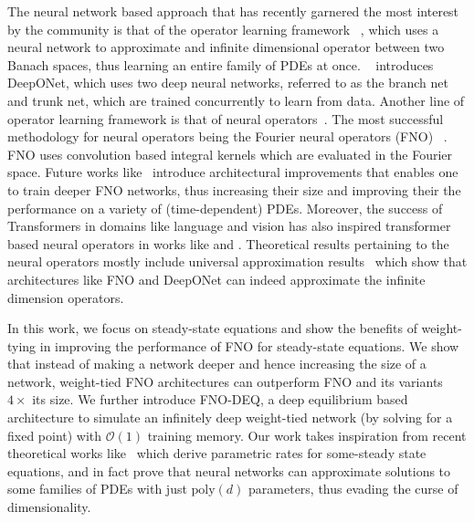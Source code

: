 The neural network based approach that has recently 
garnered the most interest by the community is that of 
the operator learning framework
~\citep{chen1995universal,kovachki2021neural,lu2019deeponet,li2020fourier,bhattacharya2021model},
which uses a neural network to approximate 
and infinite dimensional operator between two Banach spaces, 
thus learning an entire family of PDEs at once.
~\citet{lu2019deeponet} introduces DeepONet, which uses two 
deep neural networks, referred to as the branch net and trunk net, which are 
trained concurrently to learn from data.
Another line of operator learning framework is that of neural operators~\cite{kovachki2021neural}.
The most successful methodology for neural operators being the
Fourier neural operators (FNO)
~\citep{li2020fourier}.
FNO 
uses convolution based integral kernels which are evaluated in the
Fourier space. 
Future works like~\cite{tran2021factorized}
introduce architectural improvements that enables one to train 
deeper FNO networks, thus increasing their size and improving their 
the performance on a variety of (time-dependent) PDEs. 
Moreover, the success of Transformers in domains like language and vision
has also inspired transformer based neural operators in works like
\citet{li2022transformer, hao2023gnot} and \citet{Liu2022-nd}.
Theoretical results pertaining to the neural operators
mostly include universal approximation results~\cite{kovachki2021universal,lanthaler2022error} which show
that architectures like FNO and DeepONet can indeed approximate the infinite dimension operators.

In this work, we focus on steady-state equations
and show the benefits of weight-tying in improving the performance 
of FNO for steady-state equations. 
We show that instead of making a network deeper and hence increasing the size
of a network, 
weight-tied FNO architectures can outperform FNO and its variants $4\times$
its size. 
We further introduce FNO-DEQ, a deep equilibrium 
based architecture to simulate an infinitely deep weight-tied 
network (by solving for a fixed point)
with $\mathcal{O}(1)$ training memory.
Our work takes inspiration from 
recent 
theoretical works like~\cite{marwah2021parametric, chen2021representation, marwah2022neural}
which derive parametric rates for some-steady state equations, and 
in fact prove that neural networks can approximate solutions to 
some families of PDEs with just $\mbox{poly}(d)$ parameters, 
thus evading the curse of dimensionality.


